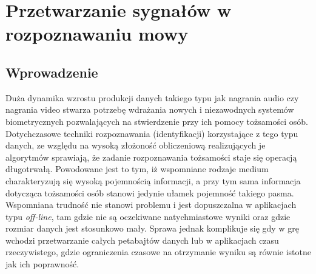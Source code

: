\chapter{Przetwarzanie sygnałów w rozpoznawaniu mowy}

\section{Wprowadzenie}

Duża dynamika wzrostu produkcji danych takiego typu jak nagrania audio czy nagrania video stwarza potrzebę wdrażania nowych i niezawodnych systemów biometrycznych pozwalających na stwierdzenie przy ich pomocy tożsamości osób. Dotychczasowe techniki rozpoznawania (identyfikacji) korzystające z tego typu danych, ze względu na wysoką złożoność obliczeniową realizujących je algorytmów sprawiają, że zadanie rozpoznawania tożsamości staje się operacją długotrwałą. Powodowane jest to tym, iż wspomniane rodzaje medium charakteryzują się wysoką pojemnością informacji, a przy tym sama informacja dotycząca tożsamości osób stanowi jedynie ułamek pojemność takiego pasma. Wspomniana trudność nie stanowi problemu i jest dopuszczalna w aplikacjach typu \textit{off-line}, tam gdzie nie są oczekiwane natychmiastowe wyniki oraz gdzie rozmiar danych jest stosunkowo mały. Sprawa jednak komplikuje się gdy w grę wchodzi przetwarzanie całych petabajtów danych lub w aplikacjach czasu rzeczywistego, gdzie ograniczenia czasowe na otrzymanie wyniku są równie istotne jak ich poprawność.

